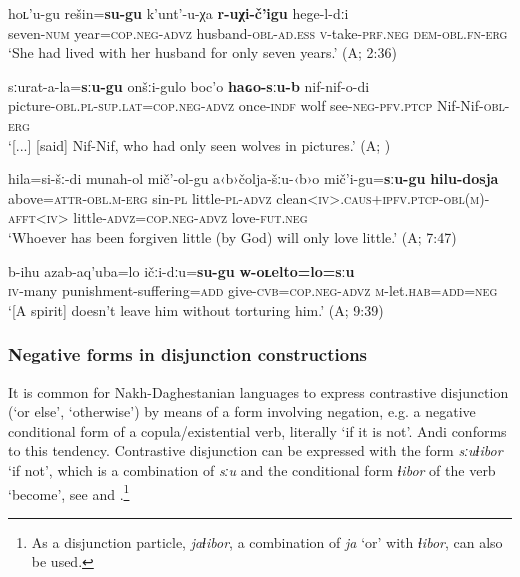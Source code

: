 \documentclass[output=paper,colorlinks=true, citecolor=brown]{langscibook}
\begin{document}
\ea
    \label{ex:and:79} 
    \gll hoʟ’u-gu rešin=\textbf{su-gu} k’unt’{}-u-χa \textbf{r-uχi-č’igu} hege-l{}-dːi \\
          seven-\textsc{num} year=\textsc{cop.neg-advz} husband-\textsc{obl}{}-\textsc{ad.ess} \textsc{v}{}-take-\textsc{prf.neg} \textsc{dem-obl.fn{}-erg} \\
    \glt ‘She had lived with her husband for only seven years.’ (A;  2:36)
\z 


\ea
    \label{ex:and:80} 
    \gll  [...] sːurat-a-la=\textbf{sːu-gu} onšːi-gulo boc’o \textbf{haɢo-sːu-b} nif-nif-o-di \\
          {} picture-\textsc{obl.pl}{}-\textsc{sup.lat=cop.neg-advz} once-\textsc{indf} wolf see-\textsc{neg-pfv.ptcp} Nif-Nif-\textsc{obl}{}-\textsc{erg} \\
    \glt ‘[...] [said] Nif-Nif, who had only seen wolves in pictures.’ (A; )
\z 

\ea
    \label{ex:and:81} 
    \gll hila=si-šː-di munah-ol mič’-ol-gu a‹b›čolja-šːu-‹b›o mič’i-gu=\textbf{sːu-gu} \textbf{hilu-dosja} \\
          above=\textsc{attr-obl.m-erg} sin-\textsc{pl} little-\textsc{pl-advz} clean<\textsc{iv>.caus+ipfv.ptcp-obl(m)-afft<iv>} little-\textsc{advz=cop.neg-advz} love-\textsc{fut.neg} \\
    \glt ‘Whoever has been forgiven little (by God) will only love little.’ (A;  7:47)
\z 

\ea
    \label{ex:and:82}
    \gll b-ihu azab-aq’uba=lo ičːi-dːu=\textbf{su-gu} \textbf{w-oʟelto=lo=sːu} \\
          \textsc{iv}{}-many punishment-suffering=\textsc{add} give-\textsc{cvb=cop.neg-advz} \textsc{m}{}-let.\textsc{hab=add=neg} \\
    \glt ‘[A spirit] doesn’t leave him without torturing him.’ (A;  9:39)
\z

\subsubsection{Negative forms in disjunction constructions} \label{sec:and:4.6.2}


It is common for Nakh-Daghestanian languages to express contrastive disjunction (‘or else’, ‘otherwise’) by means of a form involving negation, e.g. a negative conditional form of a copula/existential verb, literally ‘if it is not’. Andi conforms to this tendency. Contrastive disjunction can be expressed with the form \textit{sːuɬibor} ‘if not’, which is a combination of \textit{sːu} and the conditional form \textit{ɬibor} of the verb ‘become’, see  and .\footnote{As a disjunction particle, \textrm{\textit{jaɬibor}}, a combination of \textrm{\textit{ja}} ‘or’ with \textrm{\textit{ɬibor}}, can also be used.}
\end{document}
